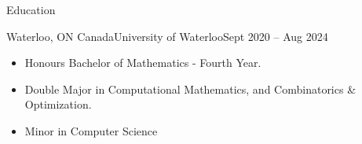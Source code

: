 \documentclass[]{mcdowellcv}
\begin{document}
	\makeheader
	
	\begin{cvsection}{Education}
		\begin{cvsubsection}{Waterloo, ON Canada}{University of Waterloo}{Sept 2020 -- Aug 2024}
			\begin{itemize}
				\item Honours Bachelor of Mathematics - Fourth Year.
				\item Double Major in Computational Mathematics, and Combinatorics \& Optimization.
				\item Minor in Computer Science
			\end{itemize}
		\end{cvsubsection}
	\end{cvsection}

\end{document}
